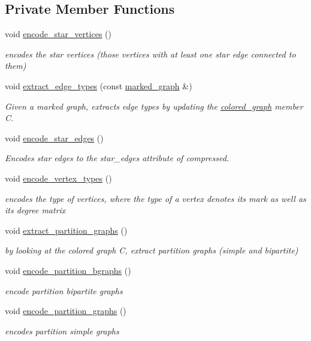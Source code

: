 \subsection*{Private Member Functions}
\begin{DoxyCompactItemize}
\item 
void \hyperlink{classmarked__graph__encoder_af8daeed1452dbfd41fa2f875813e3496}{encode\+\_\+star\+\_\+vertices} ()
\begin{DoxyCompactList}\small\item\em encodes the star vertices (those vertices with at least one star edge connected to them) \end{DoxyCompactList}\item 
void \hyperlink{classmarked__graph__encoder_ac3060e8f7e6abbe371c5968eb47cb8a1}{extract\+\_\+edge\+\_\+types} (const \hyperlink{classmarked__graph}{marked\+\_\+graph} \&)
\begin{DoxyCompactList}\small\item\em Given a marked graph, extracts edge types by updating the \hyperlink{classcolored__graph}{colored\+\_\+graph} member C. \end{DoxyCompactList}\item 
void \hyperlink{classmarked__graph__encoder_ad6883669a47d24e3d9898978f3252727}{encode\+\_\+star\+\_\+edges} ()
\begin{DoxyCompactList}\small\item\em Encodes star edges to the star\+\_\+edges attribute of compressed. \end{DoxyCompactList}\item 
void \hyperlink{classmarked__graph__encoder_a239769085214166e09cb56de750a8d71}{encode\+\_\+vertex\+\_\+types} ()
\begin{DoxyCompactList}\small\item\em encodes the type of vertices, where the type of a vertex denotes its mark as well as its degree matrix \end{DoxyCompactList}\item 
void \hyperlink{classmarked__graph__encoder_a60b0038c57bd8fa2f5cb3f0b6999c4f3}{extract\+\_\+partition\+\_\+graphs} ()
\begin{DoxyCompactList}\small\item\em by looking at the colored graph C, extract partition graphs (simple and bipartite) \end{DoxyCompactList}\item 
void \hyperlink{classmarked__graph__encoder_aa113c4870e3221faa332b2151b63d9e6}{encode\+\_\+partition\+\_\+bgraphs} ()
\begin{DoxyCompactList}\small\item\em encode partition bipartite graphs \end{DoxyCompactList}\item 
void \hyperlink{classmarked__graph__encoder_a654463d4b256b84225f5944b5e361ebf}{encode\+\_\+partition\+\_\+graphs} ()
\begin{DoxyCompactList}\small\item\em encodes partition simple graphs \end{DoxyCompactList}\end{DoxyCompactItemize}
